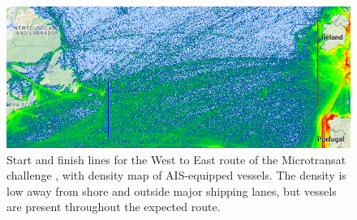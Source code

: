 \begin{figure}
\centering
\includegraphics[width=150mm,natwidth=792,natheight=313]{"./image/AIS_density_sailbot_route"}
\caption[Microtransat route and vessel density]{\label{fig:route_density}Start and finish lines for the West to East route of the Microtransat challenge \cite{transat__w-e_start-finish}, with density map of AIS-equipped vessels.  The density is low away from shore and outside major shipping lanes, but vessels are present throughout the expected route.}
\end{figure}

